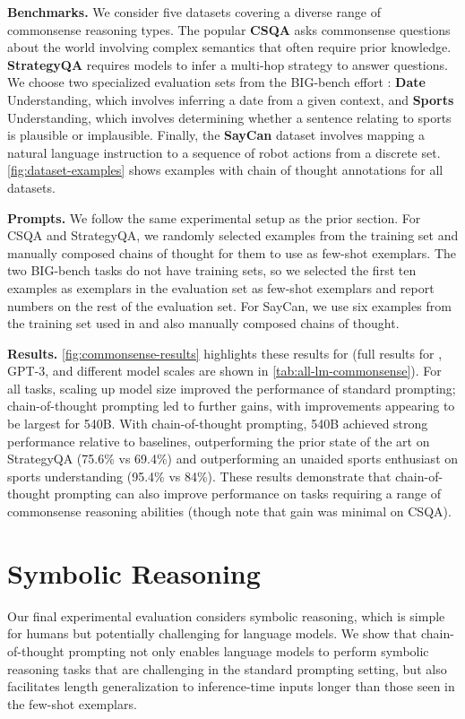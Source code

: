 \textbf{Benchmarks.}
We consider five datasets covering a diverse range of commonsense reasoning types.
The popular \textbf{CSQA} \citep{talmor-etal-2019-commonsenseqa} asks commonsense questions about the world involving complex semantics that often require prior knowledge.
\textbf{StrategyQA} \citep{geva-etal-2021-aristotle} requires models to infer a multi-hop strategy to answer questions.
We choose two specialized evaluation sets from the BIG-bench effort \citep{bigbench}: \textbf{Date} Understanding, which involves inferring a date from a given context, and \textbf{Sports} Understanding, which involves determining whether a sentence relating to sports is plausible or implausible.
Finally, the \textbf{SayCan} dataset \citep{ahn2022can} involves mapping a natural language instruction to a sequence of robot actions from a discrete set.
\cref{fig:dataset-examples} shows examples with chain of thought annotations for all datasets.

\textbf{Prompts.}
We follow the same experimental setup as the prior section. 
For CSQA and StrategyQA, we randomly selected examples from the training set and manually composed chains of thought for them to use as few-shot exemplars.
The two BIG-bench tasks do not have training sets, so we selected the first ten examples as exemplars in the evaluation set as few-shot exemplars and report numbers on the rest of the evaluation set.
For SayCan, we use six examples from the training set used in \citet{ahn2022can} and also manually composed chains of thought.

\textbf{Results.}
\cref{fig:commonsense-results} highlights these results for \palm{} (full results for \lamda{}, GPT-3, and different model scales are shown in \cref{tab:all-lm-commonsense}).
For all tasks, scaling up model size improved the performance of standard prompting; chain-of-thought prompting led to further gains, with improvements appearing to be largest for \palm{} 540B.
With chain-of-thought prompting, \palm{} 540B achieved strong performance relative to baselines, outperforming the prior state of the art on StrategyQA (75.6\% vs 69.4\%) and outperforming an unaided sports enthusiast on sports understanding (95.4\% vs 84\%).
These results demonstrate that chain-of-thought prompting can also improve performance on tasks requiring a range of commonsense reasoning abilities (though note that gain was minimal on CSQA).





\section{Symbolic Reasoning}\label{sec:symbolic-reasoning}
Our final experimental evaluation considers symbolic reasoning, which is simple for humans but potentially challenging for language models.
We show that chain-of-thought prompting not only enables language models to perform symbolic reasoning tasks that are challenging in the standard prompting setting, but also facilitates length generalization to inference-time inputs longer than those seen in the few-shot exemplars.

